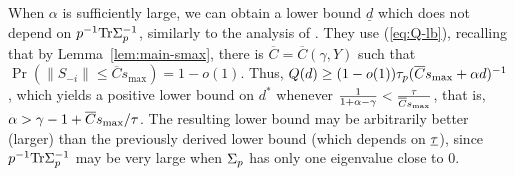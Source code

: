 \documentclass[times,sort&compress,3p]{elsarticle}
\begin{document}
\begin{remark}\label{remark:goes-alpha}
    When $\alpha$ is sufficiently large, we can obtain a lower bound $\underline{d}$ which does not depend on $p^{-1}\textrm{Tr}\Sigma_p^{-1}$, similarly to the analysis of \cite{goes2017robust}. 
    They use (\ref{eq:Q-lb}), recalling that by Lemma~\ref{lem:main-smax},  there is $\overline{C}=\overline{C}(\gamma,Y)$ such that $\Pr(\|S_{-i}\|\le \overline{C} s_{\max})=1-o(1)$. Thus, $Q(d)\ge (1-o(1))\tau_p (\overline{C}s_{\max} + \alpha d)^{-1}$, which
    yields a positive lower bound on $d^*$ whenever $\frac{1}{1+\alpha-\gamma} < \frac{\tau}{\overline{C}s_{\max}} $, that is, $\alpha > \gamma - 1 + \overline{C}s_{\max}/\tau$. The resulting lower bound may be arbitrarily better (larger) than the previously derived lower bound (which depends on $\underline{\tau}$), since $p^{-1}\textrm{Tr}\Sigma_p^{-1}$ may be very large when $\Sigma_p$ has only one eigenvalue close to $0$.
\end{remark}
\end{document}
